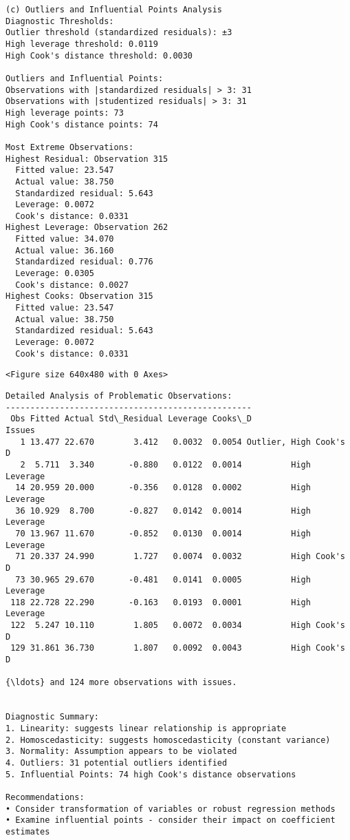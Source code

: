 \documentclass[8pt, twocolumn]{extarticle}
\begin{document}
    \begin{Verbatim}[commandchars=\\\{\}]
(c) Outliers and Influential Points Analysis
Diagnostic Thresholds:
Outlier threshold (standardized residuals): ±3
High leverage threshold: 0.0119
High Cook's distance threshold: 0.0030

Outliers and Influential Points:
Observations with |standardized residuals| > 3: 31
Observations with |studentized residuals| > 3: 31
High leverage points: 73
High Cook's distance points: 74

Most Extreme Observations:
Highest Residual: Observation 315
  Fitted value: 23.547
  Actual value: 38.750
  Standardized residual: 5.643
  Leverage: 0.0072
  Cook's distance: 0.0331
Highest Leverage: Observation 262
  Fitted value: 34.070
  Actual value: 36.160
  Standardized residual: 0.776
  Leverage: 0.0305
  Cook's distance: 0.0027
Highest Cooks: Observation 315
  Fitted value: 23.547
  Actual value: 38.750
  Standardized residual: 5.643
  Leverage: 0.0072
  Cook's distance: 0.0331
    \end{Verbatim}
    \begin{Verbatim}[commandchars=\\\{\}]
<Figure size 640x480 with 0 Axes>
    \end{Verbatim}
    \begin{Verbatim}[commandchars=\\\{\}]
Detailed Analysis of Problematic Observations:
--------------------------------------------------
 Obs Fitted Actual Std\_Residual Leverage Cooks\_D                 Issues
   1 13.477 22.670        3.412   0.0032  0.0054 Outlier, High Cook's D
   2  5.711  3.340       -0.880   0.0122  0.0014          High Leverage
  14 20.959 20.000       -0.356   0.0128  0.0002          High Leverage
  36 10.929  8.700       -0.827   0.0142  0.0014          High Leverage
  70 13.967 11.670       -0.852   0.0130  0.0014          High Leverage
  71 20.337 24.990        1.727   0.0074  0.0032          High Cook's D
  73 30.965 29.670       -0.481   0.0141  0.0005          High Leverage
 118 22.728 22.290       -0.163   0.0193  0.0001          High Leverage
 122  5.247 10.110        1.805   0.0072  0.0034          High Cook's D
 129 31.861 36.730        1.807   0.0092  0.0043          High Cook's D

{\ldots} and 124 more observations with issues.


Diagnostic Summary:
1. Linearity: suggests linear relationship is appropriate
2. Homoscedasticity: suggests homoscedasticity (constant variance)
3. Normality: Assumption appears to be violated
4. Outliers: 31 potential outliers identified
5. Influential Points: 74 high Cook's distance observations

Recommendations:
• Consider transformation of variables or robust regression methods
• Examine influential points - consider their impact on coefficient estimates
    \end{Verbatim}
\end{document}
